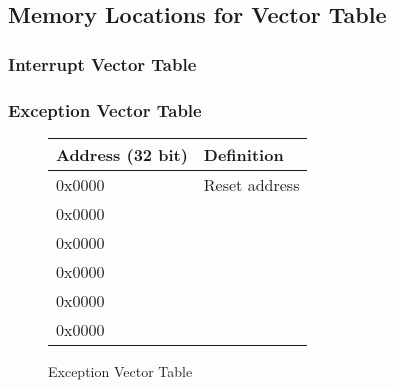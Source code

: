\documentclass[letterpaper, 11pt]{article}
\begin{document}
\subsection{Memory Locations for Vector Table}
\subsubsection{Interrupt Vector Table}
\subsubsection{Exception Vector Table}


\begin{figure}[!h]
	\begin{center}
		\begin{tabular}{|l|l|}
			\hline
			Address (32 bit) &  Definition\\ \hline
			0x0000 & Reset address \\ 	\hline
			0x0000 &  \\ 	\hline
			0x0000 &  \\ 	\hline
			0x0000 &  \\ 	\hline
			0x0000 &  \\ 	\hline
			0x0000 &  \\	\hline
		\end{tabular} 
		\caption{Exception Vector Table}
	\end{center}
	
\end{figure}
\end{document}
